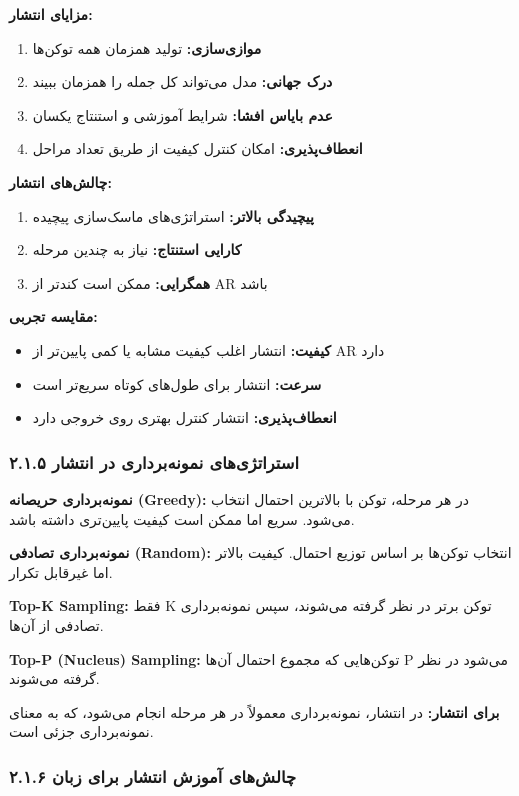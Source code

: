 \documentclass[12pt,a4paper]{article}
\theoremstyle{definition}
\begin{document}
\textbf{مزایای انتشار:}
\begin{enumerate}
    \item \textbf{موازی‌سازی:} تولید همزمان همه توکن‌ها
    \item \textbf{درک جهانی:} مدل می‌تواند کل جمله را همزمان ببیند
    \item \textbf{عدم بایاس افشا:} شرایط آموزشی و استنتاج یکسان
    \item \textbf{انعطاف‌پذیری:} امکان کنترل کیفیت از طریق تعداد مراحل
\end{enumerate}

\textbf{چالش‌های انتشار:}
\begin{enumerate}
    \item \textbf{پیچیدگی بالاتر:} استراتژی‌های ماسک‌سازی پیچیده
    \item \textbf{کارایی استنتاج:} نیاز به چندین مرحله
    \item \textbf{همگرایی:} ممکن است کندتر از AR باشد
\end{enumerate}

\textbf{مقایسه تجربی:}
\begin{itemize}
    \item \textbf{کیفیت:} انتشار اغلب کیفیت مشابه یا کمی پایین‌تر از AR دارد
    \item \textbf{سرعت:} انتشار برای طول‌های کوتاه سریع‌تر است
    \item \textbf{انعطاف‌پذیری:} انتشار کنترل بهتری روی خروجی دارد
\end{itemize}

\subsubsection*{۲.۱.۵ استراتژی‌های نمونه‌برداری در انتشار}

\textbf{نمونه‌برداری حریصانه (Greedy):}
در هر مرحله، توکن با بالاترین احتمال انتخاب می‌شود. سریع اما ممکن است کیفیت پایین‌تری داشته باشد.

\textbf{نمونه‌برداری تصادفی (Random):}
انتخاب توکن‌ها بر اساس توزیع احتمال. کیفیت بالاتر اما غیرقابل تکرار.

\textbf{Top-K Sampling:}
فقط K توکن برتر در نظر گرفته می‌شوند، سپس نمونه‌برداری تصادفی از آن‌ها.

\textbf{Top-P (Nucleus) Sampling:}
توکن‌هایی که مجموع احتمال آن‌ها P می‌شود در نظر گرفته می‌شوند.

\textbf{برای انتشار:}
در انتشار، نمونه‌برداری معمولاً در هر مرحله انجام می‌شود، که به معنای نمونه‌برداری جزئی است.

\subsubsection*{۲.۱.۶ چالش‌های آموزش انتشار برای زبان}
\end{document}
